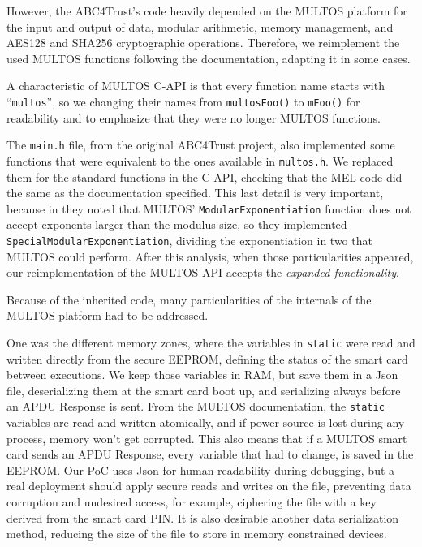 However, the ABC4Trust's code heavily depended on the MULTOS platform for the input and output of data, modular arithmetic, memory management, and AES128 and SHA256 cryptographic operations. Therefore, we reimplement the used MULTOS functions following the documentation, adapting it in some cases.

A characteristic of MULTOS C-API is that every function name starts with ``\texttt{multos}'', so we changing their names from \texttt{multosFoo()} to \texttt{mFoo()} for readability and to emphasize that they were no longer MULTOS functions.

The \texttt{main.h} file, from the original ABC4Trust project, also implemented some functions that were equivalent to the ones available in \texttt{multos.h}. We replaced them for the standard functions in the C-API, checking that the MEL code did the same as the documentation specified. This last detail is very important, because in \citep{vullers2013efficient} they noted that MULTOS' \texttt{ModularExponentiation} function does not accept exponents larger than the modulus size, so they implemented \texttt{SpecialModularExponentiation}, dividing the exponentiation in two that MULTOS could perform. After this analysis, when those particularities appeared, our reimplementation of the MULTOS API accepts the \textit{expanded functionality}.

\hfil

Because of the inherited code, many particularities of the internals of the MULTOS platform had to be addressed. 

One was the different memory zones, where the variables in \texttt{static} were read and written directly from the secure EEPROM, defining the status of the smart card between executions. We keep those variables in RAM, but save them in a Json file, deserializing them at the smart card boot up, and serializing always before an APDU Response is sent. From the MULTOS documentation, the \texttt{static} variables are read and written atomically, and if power source is lost during any process, memory won't get corrupted. This also means that if a MULTOS smart card sends an APDU Response, every variable that had to change, is saved in the EEPROM. Our PoC uses Json for human readability during debugging, but a real deployment should apply secure reads and writes on the file, preventing data corruption and undesired access, for example, ciphering the file with a key derived from the smart card PIN. It is also desirable another data serialization method, reducing the size of the file to store in memory constrained devices.


